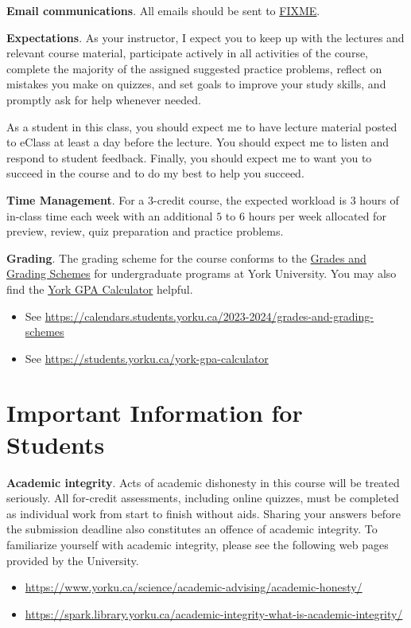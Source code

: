 \documentclass[./main.tex]{subfiles}
\begin{document}
\textbf{Email communications}.
All emails should be sent to \url{FIXME}. 

\textbf{Expectations}. 
As your instructor, I expect you to keep up with the lectures and relevant course material, participate actively in all activities of the course, complete the majority of the assigned suggested practice problems, reflect on mistakes you make on quizzes, and set goals to improve your study skills, and promptly ask for help whenever needed.

As a student in this class, you should expect me to have lecture material posted to eClass at least a day before the lecture. You should expect me to listen and respond to student feedback. Finally, you should expect me to want you to succeed in the course and to do my best to help you succeed.

\textbf{Time Management}. 
For a \(3\)-credit course, the expected workload is \(3\) hours of in-class time each week with an additional \(5\) to \(6\) hours per week allocated for preview, review, quiz preparation and practice problems.

\textbf{Grading}.
The grading scheme for the course conforms to the \href{https://calendars.students.yorku.ca/2023-2024/grades-and-grading-schemes}{Grades and Grading Schemes} for undergraduate programs at York University. You may also find the \href{https://students.yorku.ca/york-gpa-calculator}{York GPA Calculator} helpful. 
\begin{itemize}
\item See \url{https://calendars.students.yorku.ca/2023-2024/grades-and-grading-schemes}
\item See \url{https://students.yorku.ca/york-gpa-calculator}
\end{itemize}

\section*{Important Information for Students}
\textbf{Academic integrity}. Acts of academic dishonesty in this course will be treated seriously. All for-credit assessments, including online quizzes, must be completed as individual work from start to finish without aids. Sharing your answers before the submission deadline also constitutes an offence of academic integrity. To familiarize yourself with academic integrity, please see the following web pages provided by the University.
\begin{itemize}
  \item \url{https://www.yorku.ca/science/academic-advising/academic-honesty/}
  \item \url{https://spark.library.yorku.ca/academic-integrity-what-is-academic-integrity/} 
\end{itemize}
\end{document}
